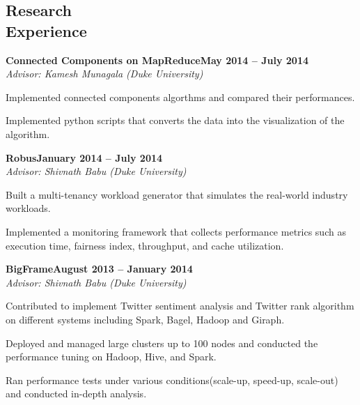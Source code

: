\documentclass[11pt,margin,line]{cv}
\begin{document}
\begin{resume}
    \section{\mysidestyle Research\\Experience}
    \textbf{Connected Components on MapReduce}\hfill \textbf{May 2014 -- July 2014} \vspace{1mm}\\\vspace{0mm}%
    \textsl{Advisor: Kamesh Munagala (Duke University)}
    \vspace{-2mm}\\\vspace{-1mm}%
    \begin{list3}
        \item Implemented connected components algorthms and compared their performances.
        \item Implemented python scripts that converts the data into the visualization of the algorithm.
    \end{list3}
    \textbf{Robus}\hfill \textbf{January 2014 -- July 2014} \vspace{1mm}\\\vspace{0mm}%
    \textsl{Advisor: Shivnath Babu (Duke University)}
    \vspace{-2mm}\\\vspace{-1mm}%
    \begin{list3}
        \item Built a multi-tenancy workload generator that simulates the real-world industry workloads.
        \item Implemented a monitoring framework that collects performance metrics such as execution time, fairness index, throughput, and cache utilization.
    \end{list3}
    \textbf{BigFrame}\hfill \textbf{August 2013 -- January 2014} \vspace{1mm}\\\vspace{0mm}%
    \textsl{Advisor: Shivnath Babu (Duke University)}
    \vspace{-2mm}\\\vspace{-1mm}%
    \begin{list3}
      \item Contributed to implement Twitter sentiment analysis and Twitter rank algorithm on different systems including Spark, Bagel, Hadoop and Giraph.
      \item Deployed and managed large clusters up to 100 nodes and conducted the performance tuning on Hadoop, Hive, and Spark.
      \item Ran performance tests under various conditions(scale-up, speed-up, scale-out) and conducted in-depth analysis.
    \end{list3}

\end{resume}
\end{document}

